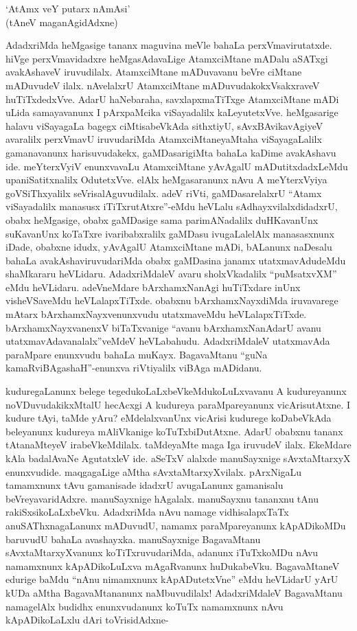 \begin{shloka}
`AtAmx veY putarx nAmAsi'\\
(tAneV maganAgidAdxne)
\end{shloka}

AdadxriMda heMgasige tananx maguvina meVle bahaLa perxVmavirutatxde. hiVge perxVmavidadxre heMgasAdavaLige AtamxciMtane mADalu aSATxgi avakAshaveV iruvudilalx. AtamxciMtane mADuvavanu beVre ciMtane mADuvudeV ilalx. nAvelalxrU AtamxciMtane mADuvudakokxVsakxraveV huTiTxdedxVve. AdarU haNebaraha, savxlapxmaTiTxge AtamxciMtane mADi uLida samayavanunx I pArxpaMcika viSayadalilx kaLeyutetxVve. heMgasarige halavu viSayagaLa bagegx ciMtisabeVkAda sithxtiyU, sAvxBAvikavAgiyeV avaralilx perxVmavU iruvudariMda AtamxciMtaneyaMtaha viSayagaLalilx gamanavanunx harisuvudakekx, gaMDasarigiMta bahaLa kaDime avakAshavu ide. meYterxVyiV enunxvavaLu AtamxciMtane yAvAgalU mADutitxdadxLeMdu upaniSatitxnalilx OdutetxVve. elAlx heMgasaranunx nAvu A meYterxVyiya goVSiThxyalilx seVrisalAguvudilalx. adeV riVti, gaMDasarelalxrU ``Atamx viSayadalilx manasusx iTiTxrutAtxre''-eMdu heVLalu sAdhayxvilalxdidadxrU, obabx heMgasige, obabx gaMDasige sama parimANadalilx duHKavanUnx suKavanUnx koTaTxre ivaribabxralilx gaMDasu ivugaLalelAlx manasasxnunx iDade, obabxne idudx, yAvAgalU AtamxciMtane mADi, bALanunx naDesalu bahaLa avakAshaviruvudariMda obabx gaMDasina janamx utatxmavAdudeMdu shaMkararu heVLidaru. AdadxriMdaleV avaru sholxVkadalilx ``puMsatxvXM'' eMdu heVLidaru. adeVneMdare bArxhamxNanAgi huTiTxdare inUnx visheVSaveMdu heVLalapxTiTxde. obabxnu bArxhamxNayxdiMda iruvavarege mAtarx bArxhamxNayxvenunxvudu utatxmaveMdu heVLalapxTiTxde. bArxhamxNayxvanenxV biTaTxvanige ``avanu bArxhamxNanAdarU avanu utatxmavAdavanalalx''veMdeV heVLabahudu. AdadxriMdaleV utatxmavAda paraMpare enunxvudu bahaLa muKayx. BagavaMtanu ``guNa kamaRviBAgashaH''-enunxva riVtiyalilx viBAga mADidanu.

kuduregaLanunx belege tegedukoLaLxbeVkeMdukoLuLxvavanu A kudureyanunx noVDuvudakikxMtalU hecAcxgi A kudureya paraMpareyanunx vicArisutAtxne. I kudure tAyi, taMde yAru? eMdelalxvanUnx vicArisi kudurege koDabeVkAda beleyanunx kudureya mAliVkanige koTuTxbiDutAtxne. AdarU obabxnu tananx tAtanaMteyeV irabeVkeMdilalx. taMdeyaMte maga Iga iruvudeV ilalx. EkeMdare kAla badalAvaNe AgutatxleV ide. aSeTxV alalxde manuSayxnige sAvxtaMtarxyX enunxvudide. maqgagaLige aMtha sAvxtaMtarxyXvilalx. pArxNigaLu tamamxnunx tAvu gamanisade idadxrU avugaLanunx gamanisalu beVreyavaridAdxre. manuSayxnige hAgalalx. manuSayxnu tananxnu tAnu rakiSxsikoLaLxbeVku. AdadxriMda nAvu namage vidhisalapxTaTx anuSAThxnagaLanunx mADuvudU, namamx paraMpareyanunx kApADikoMDu baruvudU bahaLa avashayxka. manuSayxnige BagavaMtanu sAvxtaMtarxyXvanunx koTiTxruvudariMda, adanunx iTuTxkoMDu nAvu namamxnunx kApADikoLuLxva mAgaRvanunx huDukabeVku. BagavaMtaneV edurige baMdu ``nAnu nimamxnunx kApADutetxVne'' eMdu heVLidarU yArU kUDa aMtha BagavaMtananunx naMbuvudilalx! AdadxriMdaleV BagavaMtanu namagelAlx budidhx enunxvudanunx koTuTx namamxnunx nAvu kApADikoLaLxlu dAri toVrisidAdxne-

